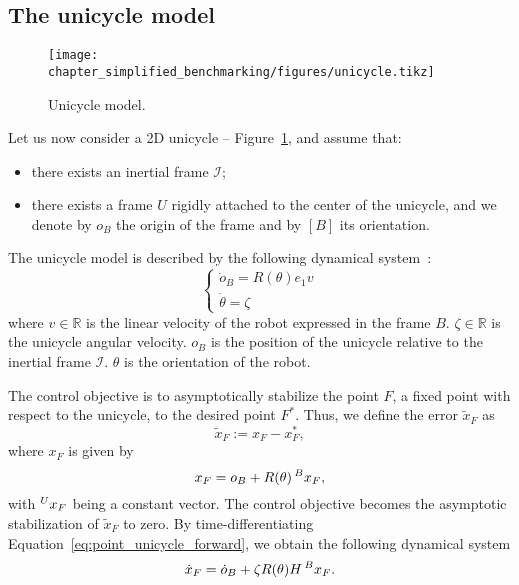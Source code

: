 \subsection{The unicycle model \label{sec:unicycle}}
\begin{figure}[!t]
  \centering
  \texttt{[image: chapter\_simplified\_benchmarking/figures/unicycle.tikz]}
  \caption{Unicycle model.\label{fig:unicycle}}
\end{figure}
Let us now consider a 2D unicycle -- Figure~\ref{fig:unicycle}, and assume that:
\begin{itemize}
    \item there exists an inertial frame $\mathcal{I}$;
    \item there exists a frame $U$ rigidly attached to the center of the unicycle, and we denote by $o_B$ the origin of the frame and by $[B]$ its orientation.
\end{itemize}
The unicycle model is described by the following dynamical system~\citep{Pucci2013}:
\begin{equation}
  \begin{cases}
    \label{eq:unicycle_dynamics}
    {\dot{o}}_{B} = R(\theta) e_1 v\\
    \dot{\theta} = \zeta
  \end{cases}
\end{equation}
where $v\in \mathbb{R}$ is the linear velocity of the robot expressed in the frame $B$. $\zeta\in \mathbb{R}$ is the unicycle angular velocity. ${o}_{B}$ is the position of the unicycle relative to the inertial frame $\mathcal{I}$. $\theta$ is the orientation of the robot. 
\par
The control objective is to asymptotically stabilize the point $F$, a fixed point with respect to the unicycle, to the desired point $F^*$. Thus, we define the error $\tilde{x}_F$ as
\begin{equation}
  \label{eq:unicycle_error}
  \tilde{x}_F:= x_F - x_F^*,
\end{equation}
where $x_F$ is given by
\begin{equation}
  \label{eq:point_unicycle_forward}
   x_F =
o_B +
R(\theta) \prescript{B}{}{x}_F,
\end{equation}
with $\prescript{U}{}{x}_F$ being a constant vector.  
The control objective becomes the asymptotic stabilization of $\tilde{x}_F$ to zero.
By time-differentiating Equation~\eqref{eq:point_unicycle_forward}, we obtain the following dynamical system
\begin{equation}
\label{eq:unicycle_output_dynamics}
    \dot{x}_F = \dot{o}_B + \zeta R(\theta) H \prescript{B}{}{x}_F.
\end{equation}
